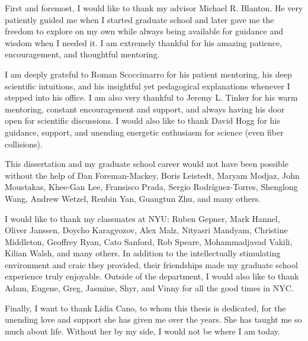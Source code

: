 First and foremost, I would like to thank my advisor Michael R. Blanton. 
He very patiently guided me when I started graduate school and later gave me 
the freedom to explore on my own while always being available for guidance and 
wisdom when I needed it. I am extremely thankful for his amazing patience, 
encouragement, and thoughtful mentoring. 

I am deeply grateful to Roman Scoccimarro for his patient mentoring, his 
deep scientific intuitions, and his insightful yet pedagogical explanations whenever
I stepped into his office.
I am also very thankful to Jeremy L. Tinker for his warm mentoring, constant 
encouragement and support, and always having his door open for scientific discussions.
I would also like to thank David Hogg for his guidance, support, and unending energetic 
enthusiasm for science (even fiber collisions).

This dissertation and my graduate school career would not have been possible without 
the help of 
Dan Foreman-Mackey, 
Boris Leistedt, 
Maryam Modjaz, 
John Moustakas, 
Khee-Gan Lee, 
Fransisco Prada, 
Sergio Rodr\'{i}guez-Torres, 
Shenglong Wang, 
Andrew Wetzel, 
Renbin Yan, 
Guangtun Zhu, 
and many others. 

I would like to thank my classmates at NYU: 
Ruben Gepner, 
Mark Hannel, 
Oliver Janssen, 
Doycho Karagyozov, 
Alex Malz, 
Nityasri Mandyam, 
Christine Middleton, 
Geoffrey Ryan, 
Cato Sanford, 
Rob Speare, 
Mohammadjavad Vakili, 
Kilian Walsh, 
and many others. 
In addition to the intellectually stimulating environment and craic they provided, 
their friendships made my graduate school experience truly enjoyable. 
Outside of the department, I would also like to thank Adam, Eugene, 
Greg, Jasmine, Shyr, and Vinny for all the good times in NYC. 

Finally, I want to thank Lidia Cano, to whom this thesis is dedicated, for the 
unending love and support she has given me over the years. She has taught me 
so much about life. Without her by my side, I would not be where I am today. 

